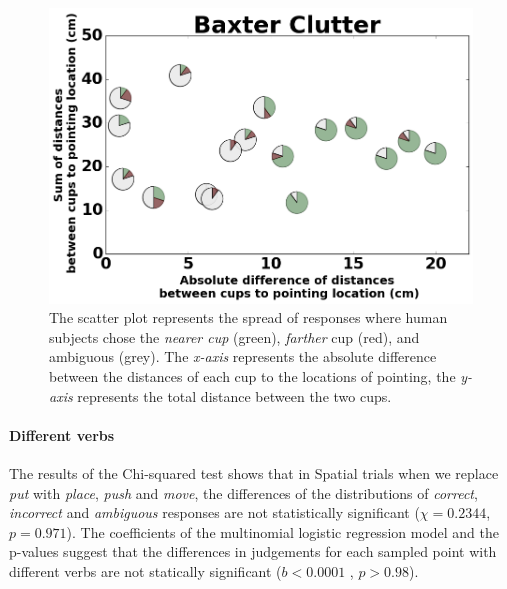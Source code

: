 \begin{figure}[H]
    \centering
    \includegraphics[width=\linewidth]{figures/baxter_Clutter_granular.png}
    \caption{
    The scatter plot represents the spread of responses where human subjects chose the \textit{nearer cup} (green), \textit{farther} cup (red), and ambiguous (grey). 
    The \textit{x-axis} represents the absolute difference between the distances of each cup to the locations of pointing, the \textit{y-axis} represents the total distance between the two cups.
    }
    \label{fig:cluttered}
\end{figure}

\paragraph{Different verbs}
The results of the Chi-squared test shows that in Spatial trials when we replace \textit{put} with \textit{place}, \textit{push} and \textit{move}, the differences of the distributions of \textit{correct}, \textit{incorrect} and \textit{ambiguous} responses are not statistically significant ($\chi=0.2344 $, $p = 0.971$). The coefficients of the multinomial logistic regression model and the p-values suggest that the differences in judgements for each sampled point with different verbs are not statically significant ($b<0.0001$ , $p>0.98$).



